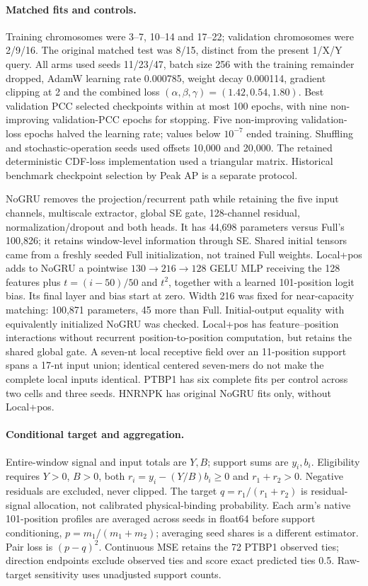 \documentclass[11pt]{article}
\begin{document}
\paragraph{Matched fits and controls.} Training chromosomes were 3--7, 10--14 and 17--22; validation chromosomes were 2/9/16. The original matched test was 8/15, distinct from the present 1/X/Y query. All arms used seeds 11/23/47, batch size 256 with the training remainder dropped, AdamW learning rate 0.000785, weight decay 0.000114, gradient clipping at 2 and the combined loss $(\alpha,\beta,\gamma)=(1.42,0.54,1.80)$. Best validation PCC selected checkpoints within at most 100 epochs, with nine non-improving validation-PCC epochs for stopping. Five non-improving validation-loss epochs halved the learning rate; values below $10^{-7}$ ended training. Shuffling and stochastic-operation seeds used offsets 10,000 and 20,000. The retained deterministic CDF-loss implementation used a triangular matrix. Historical benchmark checkpoint selection by Peak AP is a separate protocol.

NoGRU removes the projection/recurrent path while retaining the five input channels, multiscale extractor, global SE gate, 128-channel residual, normalization/dropout and both heads. It has 44,698 parameters versus Full's 100,826; it retains window-level information through SE. Shared initial tensors came from a freshly seeded Full initialization, not trained Full weights. Local+pos adds to NoGRU a pointwise $130\to216\to128$ GELU MLP receiving the 128 features plus $t=(i-50)/50$ and $t^2$, together with a learned 101-position logit bias. Its final layer and bias start at zero. Width 216 was fixed for near-capacity matching: 100,871 parameters, 45 more than Full. Initial-output equality with equivalently initialized NoGRU was checked. Local+pos has feature--position interactions without recurrent position-to-position computation, but retains the shared global gate. A seven-nt local receptive field over an 11-position support spans a 17-nt input union; identical centered seven-mers do not make the complete local inputs identical. PTBP1 has six complete fits per control across two cells and three seeds. HNRNPK has original NoGRU fits only, without Local+pos.

\paragraph{Conditional target and aggregation.} Entire-window signal and input totals are $Y,B$; support sums are $y_i,b_i$. Eligibility requires $Y>0$, $B>0$, both $r_i=y_i-(Y/B)b_i\geq0$ and $r_1+r_2>0$. Negative residuals are excluded, never clipped. The target $q=r_1/(r_1+r_2)$ is residual-signal allocation, not calibrated physical-binding probability. Each arm's native 101-position profiles are averaged across seeds in float64 before support conditioning, $p=m_1/(m_1+m_2)$; averaging seed shares is a different estimator. Pair loss is $(p-q)^2$. Continuous MSE retains the 72 PTBP1 observed ties; direction endpoints exclude observed ties and score exact predicted ties 0.5. Raw-target sensitivity uses unadjusted support counts.
\end{document}

